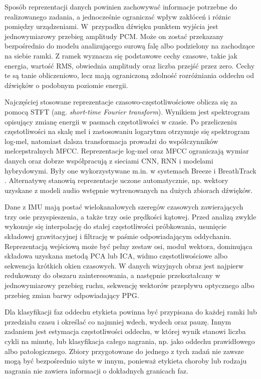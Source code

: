 Sposób reprezentacji danych powinien zachowywać informacje potrzebne do realizowanego zadania, a jednocześnie ograniczać wpływ zakłóceń i różnic pomiędzy urządzeniami. W~przypadku dźwięku punktem wyjścia jest jednowymiarowy przebieg amplitudy PCM. Może on zostać przekazany bezpośrednio do modelu analizującego surową falę albo podzielony na zachodzące na siebie ramki. Z ramek wyznacza się podstawowe cechy czasowe, takie jak energia, wartość RMS, obwiednia amplitudy oraz liczba przejść przez zero. Cechy te są tanie obliczeniowo, lecz mają ograniczoną zdolność rozróżniania oddechu od dźwięków o podobnym poziomie energii.

Najczęściej stosowane reprezentacje czasowo-częstotliwościowe oblicza się za pomocą STFT (ang. \textit{short-time Fourier transform}). Wynikiem jest spektrogram opisujący zmianę energii w pasmach częstotliwości w czasie. Po przeliczeniu częstotliwości na skalę mel i zastosowaniu logarytmu otrzymuje się spektrogram log-mel, natomiast dalsza transformacja prowadzi do współczynników melcepstralnych MFCC. Reprezentacje log-mel oraz MFCC ograniczają wymiar danych oraz dobrze współpracują z sieciami CNN, RNN i modelami hybrydowymi. Były one wykorzystywane m.in. w systemach Breeze i BreathTrack \cite{10.1145/3369835,10.1145/3478123}. Alternatywę stanowią reprezentacje uczone automatycznie, np. wektory uzyskane z modeli audio wstępnie wytrenowanych na dużych zbiorach dźwięków.

Dane z IMU mają postać wielokanałowych szeregów czasowych zawierających trzy osie przyspieszenia, a także trzy osie prędkości kątowej. Przed analizą zwykle wykonuje się interpolację do stałej częstotliwości próbkowania, usunięcie składowej grawitacyjnej i filtrację w paśmie odpowiadającym oddychaniu. Reprezentacją wejściową może być pełny zestaw osi, moduł wektora, dominująca składowa uzyskana metodą PCA lub ICA, widmo częstotliwościowe albo sekwencja krótkich okien czasowych. W danych wizyjnych obraz jest najpierw redukowany do obszaru zainteresowania, a następnie przekształcany w jednowymiarowy przebieg ruchu, sekwencję wektorów przepływu optycznego albo przebieg zmian barwy odpowiadający PPG.

Dla klasyfikacji faz oddechu etykieta powinna być przypisana do każdej ramki lub przedziału czasu i określać co najmniej wdech, wydech oraz pauzę. Innym zadaniem jest estymacja częstotliwości oddechu, w której wynik stanowi liczba cykli na minutę, lub klasyfikacja całego nagrania, np. jako oddechu prawidłowego albo patologicznego. Zbiory przygotowane do jednego z tych zadań nie zawsze mogą być bezpośrednio użyte w innym, ponieważ etykieta choroby lub rodzaju nagrania nie zawiera informacji o dokładnych granicach faz.

